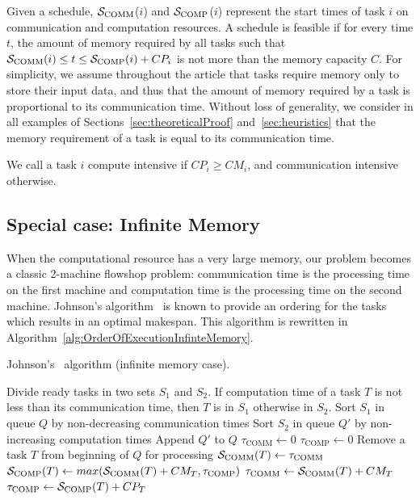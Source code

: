 \documentclass[runningheads]{llncs} %
\newcommand{\scomm}{\ensuremath{{\cal S}_{\text{COMM}}}}
\newcommand{\scomp}{\ensuremath{{\cal S}_{\text{COMP}}}}
\begin{document}
Given a schedule, \scomm($i$) and \scomp($i$) represent the
start times of task $i$ on communication and computation
resources. A schedule is feasible if for every time $t$, the
amount of memory required by all tasks such that $\scomm(i) \leq t
\leq \scomp(i) + CP_i$ is not more than the memory capacity
$C$. 
For simplicity, we assume throughout the article that tasks
require memory only to store their input data, and thus that
the amount of memory required by a task is proportional to its
communication time. Without loss of generality, we consider in
all examples of Sections~\ref{sec:theoreticalProof}
and~\ref{sec:heuristics} that the memory requirement of a task
is equal to its communication time.

We call a task $i$ compute intensive if $CP_i \ge CM_i$, and
communication intensive otherwise.

\subsection{Special case: Infinite Memory}

When the computational resource has a very large memory, our problem
becomes a classic 2-machine flowshop problem: communication time is
the processing time on the first machine and computation time is the
processing time on the second machine. Johnson's
algorithm~\cite{johnson} is known to provide an ordering for the tasks
which results in an optimal makespan. This algorithm is rewritten in
Algorithm~\ref{alg:OrderOfExecutionInfinteMemory}.

\begin{algorithm}
	\caption{\label{alg:OrderOfExecutionInfinteMemory}Johnson's~\cite{johnson} algorithm (infinite memory case).}
	\begin{algorithmic}[1]
		\STATE Divide ready tasks in two sets $S_1$ and $S_2$. If computation time of a task $T$ is not less than its communication time, then $T$ is in $S_1$ otherwise in $S_2$.
		\STATE Sort $S_1$ in queue $Q$ by non-decreasing communication times
		\STATE Sort $S_2$ in queue $Q'$ by non-increasing computation times
		\STATE Append $Q'$ to $Q$
		\STATE $\tau_{\text{COMM}} \gets 0$ \hfill{}
		\STATE $\tau_{\text{COMP}} \gets 0$\hfill {}
		\STATE Remove a task $T$ from beginning of $Q$ for processing
		\STATE $\scomm(T) \gets \tau_{\text{COMM}}$
		\STATE $\scomp(T) \gets max(\scomm(T) + CM_T, \tau_{\text{COMP}})$
		\STATE $\tau_{\text{COMM}} \gets \scomm(T) + CM_T$
		\STATE $\tau_{\text{COMP}} \gets \scomp(T) + CP_T$
		\ENDWHILE
	\end{algorithmic}
\end{algorithm}
\end{document}
